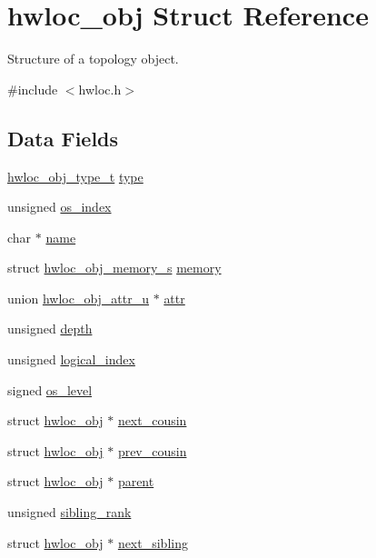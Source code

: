 \hypertarget{a00016}{
\section{hwloc\_\-obj Struct Reference}
\label{a00016}
}


Structure of a topology object.  




{\ttfamily \#include $<$hwloc.h$>$}

\subsection*{Data Fields}
\begin{DoxyCompactItemize}
\item 
\hyperlink{a00041_gacd37bb612667dc437d66bfb175a8dc55}{hwloc\_\-obj\_\-type\_\-t} \hyperlink{a00016_acc4f0803f244867e68fe0036800be5de}{type}
\item 
unsigned \hyperlink{a00016_a61a7a80a68eaccbaaa28269e678c81a9}{os\_\-index}
\item 
char $\ast$ \hyperlink{a00016_abb709ec38f2970677e4e57d1d30be96d}{name}
\item 
struct \hyperlink{a00020}{hwloc\_\-obj\_\-memory\_\-s} \hyperlink{a00016_a1dc830816716213b5f797e4052487864}{memory}
\item 
union \hyperlink{a00017}{hwloc\_\-obj\_\-attr\_\-u} $\ast$ \hyperlink{a00016_accd40e29f71f19e88db62ea3df02adc8}{attr}
\item 
unsigned \hyperlink{a00016_a9d82690370275d42d652eccdea5d3ee5}{depth}
\item 
unsigned \hyperlink{a00016_a0d07fb7b8935e137c94d75a3eb492ae9}{logical\_\-index}
\item 
signed \hyperlink{a00016_a68766f0b1c4d61b5bad87e3b81dacfde}{os\_\-level}
\item 
struct \hyperlink{a00016}{hwloc\_\-obj} $\ast$ \hyperlink{a00016_a85a788017457129589318b6c39451acf}{next\_\-cousin}
\item 
struct \hyperlink{a00016}{hwloc\_\-obj} $\ast$ \hyperlink{a00016_ac715989f55ff5a0eb6be2969ee477ec0}{prev\_\-cousin}
\item 
struct \hyperlink{a00016}{hwloc\_\-obj} $\ast$ \hyperlink{a00016_adc494f6aed939992be1c55cca5822900}{parent}
\item 
unsigned \hyperlink{a00016_aaa6043eee6f55869933c1d974efd9acd}{sibling\_\-rank}
\item 
struct \hyperlink{a00016}{hwloc\_\-obj} $\ast$ \hyperlink{a00016_a7f2343ed476fe4942e6fffd4cade1b40}{next\_\-sibling}

\end{DoxyCompactItemize}
